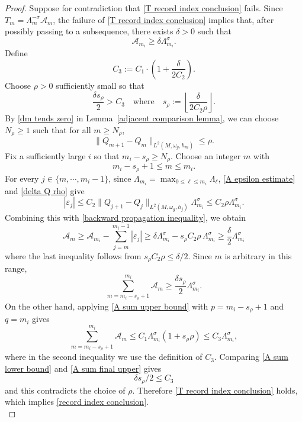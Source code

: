 \documentclass[12pt, reqno]{amsart}
\newcommand\cA{{\mathcal A}}
\theoremstyle{plain}
\theoremstyle{definition}
\newcommand{\beq}{\begin{equation}}
\newcommand{\eeq}{\end{equation}}
\newcommand{\qtq}[1]{\quad\mbox{#1}\quad}
\renewcommand{\>}{\rightarrow}
\newcommand{\om}{\omega}
\numberwithin{equation}{section}
\begin{document}
\begin{proof}
	
	Suppose for contradiction that \eqref{T record index conclusion} fails.
	Since $T_m=\Lambda_m^{-\sigma}\cA_m$, the failure of
	\eqref{T record index conclusion} implies that, after possibly passing to a
	subsequence, there exists $\delta>0$ such that
	\begin{equation}
	\cA_{m_i}\geq\delta\Lambda_{m_i}^\sigma.
	\label{record contradiction assumption}
	\end{equation}
	Define \beq C_3:=C_1\cdot\left(1+\frac{\delta}{2C_2}\right).\eeq  Choose $\rho>0$
	sufficiently small so that
	\begin{equation}
	\frac{\delta s_\rho}{2}>C_3\qtq{where}
	s_\rho:=\left\lfloor\frac{\delta}{2C_2\rho}\right\rfloor.
	\label{s rho definition}
	\end{equation}
	By \eqref{dm tends zero} in
	Lemma~\ref{adjacent comparison lemma}, we can choose $N_\rho\geq1$ such
	that for all $m\geq N_\rho$,
	\beq
	\|Q_{m+1}-Q_m\|_{L^2(M,\om_g,h_m)}\leq\rho.\label{delta Q rho}
	\eeq
Fix a sufficiently large $i$ so that
	$m_i-s_\rho\geq N_\rho$.  Choose an integer $m$ with $$m_i-s_\rho+1\leq m\leq m_i.$$  
	For every $j\in\{m,\cdots,m_i-1\}$, since
	$\Lambda_{m_i}=\max_{0\leq \ell\leq m_i}\Lambda_\ell$, 
	\eqref{A epsilon estimate} and \eqref{delta Q rho} give
	\beq
	|\varepsilon_j|
	\leq C_2\|Q_{j+1}-Q_j\|_{L^2(M,\om_g,h_j)}\Lambda_{m_i}^\sigma
	\leq C_2\rho\Lambda_{m_i}^\sigma.
	\eeq
	Combining this with \eqref{backward propagation inequality}, we obtain
	\beq
	\cA_m
	\geq \cA_{m_i}-\sum_{j=m}^{m_i-1}|\varepsilon_j|
	\geq \delta\Lambda_{m_i}^\sigma
	-s_\rho C_2\rho\,\Lambda_{m_i}^\sigma
	\geq\frac{\delta}{2}\Lambda_{m_i}^\sigma
	\eeq
	where the last inequality follows from
	$s_\rho C_2\rho\leq\delta/2$.
	Since $m$ is arbitrary in this range,
	\begin{equation}
	\sum_{m=m_i-s_\rho+1}^{m_i}\cA_m
	\geq\frac{\delta s_\rho}{2}\Lambda_{m_i}^\sigma.
	\label{A sum lower bound}
	\end{equation}
	On the other hand, applying \eqref{A sum upper bound} with
	$p=m_i-s_\rho+1$ and $q=m_i$ gives
	\begin{equation}
	\sum_{m=m_i-s_\rho+1}^{m_i}\cA_m
	\leq C_1\Lambda_{m_i}^\sigma(1+s_\rho\rho)
	\leq C_3\Lambda_{m_i}^\sigma,
	\label{A sum final upper}
	\end{equation}
	where in the second inequality we use the definition of $C_3$. 
	Comparing \eqref{A sum lower bound} and
	\eqref{A sum final upper} gives \beq \delta s_\rho/2\leq C_3\eeq  and this contradicts 
	the choice of $\rho$.  Therefore
	\eqref{T record index conclusion} holds, which implies \eqref{record index conclusion}.\\
	

\end{proof}
\end{document}

